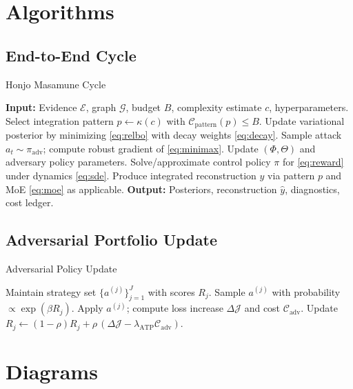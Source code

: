 \documentclass[12pt,a4paper]{article}
\begin{document}
\section{Algorithms}
\subsection{End-to-End Cycle}
\begin{algorithm}[H]
\caption{Honjo Masamune Cycle}
\label{alg:cycle}
\begin{algorithmic}[1]
\State \textbf{Input:} Evidence $\mathcal{E}$, graph $\mathcal{G}$, budget $B$, complexity estimate $c$, hyperparameters.
\State Select integration pattern $p \gets \kappa(c)$ with $\mathcal{C}_{\text{pattern}}(p) \le B$.
\State Update variational posterior by minimizing \eqref{eq:relbo} with decay weights \eqref{eq:decay}.
  \State Sample attack $a_t \sim \pi_{\text{adv}}$; compute robust gradient of \eqref{eq:minimax}.
  \State Update $(\Phi,\Theta)$ and adversary policy parameters.
\EndFor
\State Solve/approximate control policy $\pi$ for \eqref{eq:reward} under dynamics \eqref{eq:sde}.
\State Produce integrated reconstruction $\hat{y}$ via pattern $p$ and MoE \eqref{eq:moe} as applicable.
\State \textbf{Output:} Posteriors, reconstruction $\hat{y}$, diagnostics, cost ledger.
\end{algorithmic}
\end{algorithm}

\subsection{Adversarial Portfolio Update}
\begin{algorithm}[H]
\caption{Adversarial Policy Update}
\label{alg:adv}
\begin{algorithmic}[1]
\State Maintain strategy set $\{a^{(j)}\}_{j=1}^{J}$ with scores $R_j$.
  \State Sample $a^{(j)}$ with probability $\propto \exp(\beta R_j)$.
  \State Apply $a^{(j)}$; compute loss increase $\Delta \mathcal{J}$ and cost $\mathcal{C}_{\text{adv}}$.
  \State Update $R_j \leftarrow (1-\rho)R_j + \rho\,(\Delta \mathcal{J} - \lambda_{\text{ATP}}\mathcal{C}_{\text{adv}})$.
\EndFor
\end{algorithmic}
\end{algorithm}

\section{Diagrams}
\end{document}
